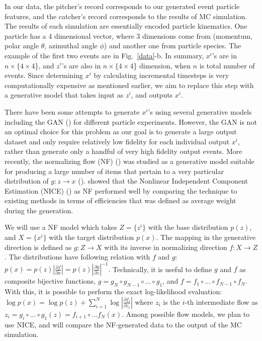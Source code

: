 In our data, the pitcher's record corresponds to our generated event particle features, and the catcher's record corresponds to the results of MC simulation. The results of each simulation are essentially encoded particle kinematics. One particle has a 4 dimensional vector, where 3 dimensions come from (momentum, polar angle $\theta$, azimuthal angle $\phi$) and another one from particle species. The example of the first two events are in Fig.~\ref{data}-b. In summary, $x^i$'s are in $n\times\{4\times$4\}, and $z^i$'s are also in $n\times\{4\times$4\} dimension, when $n$ is total number of events. Since determining $x^i$ by calculating incremental timesteps is very computationally expensive as mentioned earlier, we aim to replace this step with a generative model that takes input as $z^i$, and outputs $x^i$.

There have been some attempts to generate $x^i$'s using several generative models including the GAN (\citet{Paganini2017}) for different particle experiments. However, the GAN is not an optimal choice for this problem as our goal is to generate a large output dataset and only require relatively low fidelity for each individual output $x^i$, rather than generate only a handful of very high fidelity output events. More recently, the normalizing flow (NF) (\citet{papamakarios2019normalizing}) was studied as a generative model suitable for producing a large number of items that pertain to a very particular distribution of $g: z\rightarrow x$ (\citet{9089305}). \citet{PhysRevD.101.076002} showed that the Nonlinear Independent Component Estimation (NICE) (\citet{Dinh15}) as NF performed well by comparing the technique to existing methods in terms of efficiencies that was defined as average weight during the generation.

We will use a NF model which takes $Z=\{z^i\}$ with the base distribution $p(z)$, and $X=\{x^i\}$ with the target distribution $p(x)$. The mapping in the generative direction is defined as $g:Z\rightarrow X$ with its inverse in normalizing direction $f:X\rightarrow Z$. The distributions have following relation with $f$ and $g$: $p(x)= p(z)|\frac{\partial f}{\partial x}| =  p(z)|\frac{\partial g}{\partial z}|^{-1}$. Technically, it is useful to define $g$ and $f$ as composite bijective functions, $g= g_N \circ g_{N-1}\circ ... \circ g_1$, and $f= f_1 \circ ... \circ f_{N-1} \circ f_N$. With this, it is possible to perform the exact log-likelihood evaluation: $\log p(x) = \log p(z) + \sum\limits_{i=1}^N \log|\frac{\partial f_i}{\partial z_i}|$ where $z_i$ is the $i$-th intermediate flow as $z_i=g_i \circ ... \circ g_1(z) = f_{i+1}\circ ...f_N(x)$. Among possible flow models, we plan to use NICE, and will compare the NF-generated data to the output of the MC simulation.

